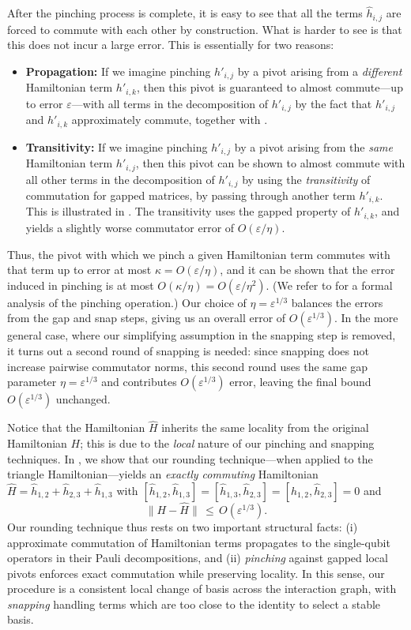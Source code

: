 \documentclass[a4paper,onecolumn,11pt]{quantumarticle}
\theoremstyle{plain}
\newcommand{\eps}{\varepsilon}
\begin{document}
\begin{enumerate}
After the pinching process is complete, it is easy to see that all the terms $\hat{h}_{i,j}$ are forced to commute with each other by construction. What is harder to see is that this does not incur a large error. This is essentially for two reasons:
\begin{itemize}
    \item \textbf{Propagation:} If we imagine pinching $h'_{i,j}$ by a pivot arising from a \emph{different} Hamiltonian term $h'_{i,k}$, then this pivot is guaranteed to almost commute---up to error $\eps$---with all terms in the decomposition of $h'_{i,j}$ by the fact that $h'_{i,j}$ and $h'_{i,k}$ approximately commute, together with .
    \item \textbf{Transitivity:} If we imagine pinching $h'_{i,j}$ by a pivot arising from the \emph{same} Hamiltonian term $h'_{i,j}$, then this pivot can be shown to almost commute with all other terms in the decomposition of $h'_{i,j}$ by using the \emph{transitivity} of commutation for gapped matrices, by passing through another term $h'_{i,k}$. This is illustrated in . The transitivity uses the gapped property of $h'_{i,k}$, and yields a slightly worse commutator error of $O(\eps/\eta)$.
\end{itemize}
Thus, the pivot with which we pinch a given Hamiltonian term commutes with that term up to error at most $\kappa = O(\eps/\eta)$, and it can be shown that the error induced in pinching is at most $O(\kappa / \eta) = O(\eps/\eta^2)$. (We refer to  for a formal analysis of the pinching operation.) Our choice of $\eta = \eps^{1/3}$ balances the errors from the gap and snap steps, giving us an overall error of $O(\eps^{1/3})$. In the more general case, where our simplifying assumption in the snapping step is removed, it turns out a second round of snapping is needed: since snapping does not increase pairwise commutator norms, this second round uses the same gap parameter $\eta = \eps^{1/3}$ and contributes $O(\eps^{1/3})$ error, leaving the final bound $O(\eps^{1/3})$ unchanged.
\end{enumerate}    


Notice that the Hamiltonian $\hat H$ inherits the same locality from the original Hamiltonian $H$; this is due to the \emph{local} nature of our pinching and snapping techniques.
In , we show that our rounding technique---when  applied to the triangle Hamiltonian---yields an \emph{exactly commuting} Hamiltonian $\hat{H} = \hat h_{1,2} + \hat h_{2,3} + \hat h_{1,3}$ with $[\hat h_{1,2},\hat h_{1,3}] = [\hat h_{1,3},\hat h_{2,3}] = [\hat h_{1,2},\hat h_{2,3}] = 0$ and
$$
\| H - \hat{H} \| \, \leq \, O(\eps^{1/3}).
$$
Our rounding technique thus rests on two important structural facts: (i) approximate commutation of
Hamiltonian terms propagates to the single-qubit operators in their Pauli
decompositions, and (ii) \emph{pinching} against gapped local pivots enforces exact
commutation while preserving locality.  In this sense, our procedure is a
consistent local change of basis across the interaction graph, with \emph{snapping}
handling terms which are too close to the identity to select a stable basis. 
\end{document}
